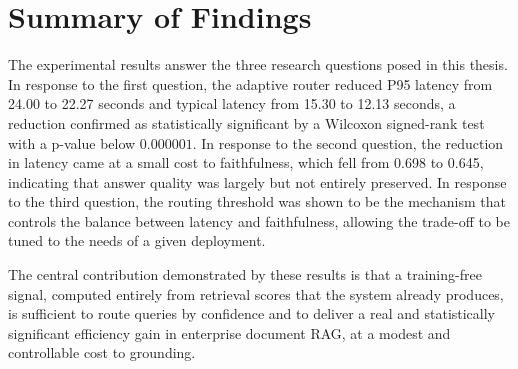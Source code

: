 \documentclass[12pt, a4paper, oneside]{report}
\begin{document}
\section{Summary of Findings}

The experimental results answer the three research questions posed in this thesis. In response to the first question, the adaptive router reduced P95 latency from 24.00 to 22.27 seconds and typical latency from 15.30 to 12.13 seconds, a reduction confirmed as statistically significant by a Wilcoxon signed-rank test with a p-value below $0.000001$. In response to the second question, the reduction in latency came at a small cost to faithfulness, which fell from 0.698 to 0.645, indicating that answer quality was largely but not entirely preserved. In response to the third question, the routing threshold was shown to be the mechanism that controls the balance between latency and faithfulness, allowing the trade-off to be tuned to the needs of a given deployment.

The central contribution demonstrated by these results is that a training-free signal, computed entirely from retrieval scores that the system already produces, is sufficient to route queries by confidence and to deliver a real and statistically significant efficiency gain in enterprise document RAG, at a modest and controllable cost to grounding.
\end{document}

